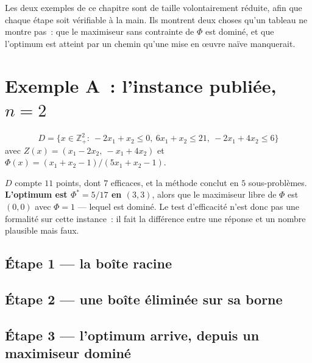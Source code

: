 \documentclass[12pt,a4paper]{report}
\newcommand{\Dset}{D}
\newcommand{\Z}{Z}
\newcommand{\fig}[1]{}
\theoremstyle{plain}
\theoremstyle{definition}
\begin{document}
Les deux exemples de ce chapitre sont de taille volontairement réduite, afin
que chaque étape soit vérifiable à la main.  Ils montrent deux choses qu'un
tableau ne montre pas~: que le maximiseur sans contrainte de $\Phi$ est dominé,
et que l'optimum est atteint par un chemin qu'une mise en {\oe}uvre naïve
manquerait.

\section{Exemple A~: l'instance publiée, \texorpdfstring{$n=2$}{n=2}}

\[
  \Dset = \{x \in \mathbb{Z}^2_+ :\ -2x_1 + x_2 \leqslant 0,\
  6x_1 + x_2 \leqslant 21,\ -2x_1 + 4x_2 \leqslant 6\}
\]
avec $\Z(x) = (x_1 - 2x_2,\ -x_1 + 4x_2)$ et
$\Phi(x) = (x_1 + x_2 - 1)/(5x_1 + x_2 - 1)$.

$\Dset$ compte $11$ points, dont $7$ efficaces, et la méthode conclut en $5$
sous-problèmes.  \textbf{L'optimum est $\Phi^{*} = 5/17$ en $(3,3)$}, alors que
le maximiseur libre de $\Phi$ est $(0,0)$ avec $\Phi = 1$ --- lequel est
dominé.  Le test d'efficacité n'est donc pas une formalité sur cette instance~:
il fait la différence entre une réponse et un nombre plausible mais faux.

\begin{center}
\fig{a-decision}
\end{center}

\subsection*{Étape 1 --- la boîte racine}
\begin{center}\fig{a-step1}\end{center}

\subsection*{Étape 2 --- une boîte éliminée sur sa borne}
\begin{center}\fig{a-step2}\end{center}

\subsection*{Étape 3 --- l'optimum arrive, depuis un maximiseur dominé}
\begin{center}\fig{a-step3}\end{center}
\end{document}
